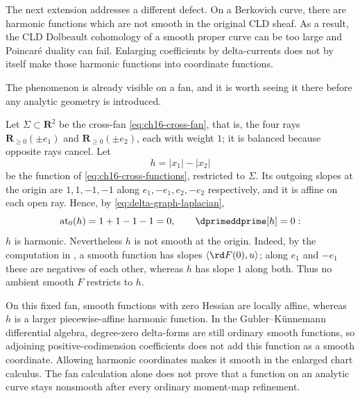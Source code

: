 The next extension addresses a different defect.  On a Berkovich curve,
there are harmonic functions which are not smooth in the original CLD
sheaf.  As a result, the CLD Dolbeault cohomology of a smooth proper curve
can be too large and Poincar\'e duality can fail.  Enlarging coefficients by
delta-currents does not by itself make those harmonic functions into
coordinate functions.

The phenomenon is already visible on a fan, and it is worth seeing it there
before any analytic geometry is introduced.

\begin{example}
\label{ex:ch18-harmonic-not-smooth}
Let $\Sigma\subset\mathbf R^2$ be the cross-fan \eqref{eq:ch16-cross-fan},
that is, the four rays $\mathbf R_{\geq0}(\pm e_1)$ and
$\mathbf R_{\geq0}(\pm e_2)$, each with weight $1$; it is balanced because
opposite rays cancel.  Let
\[
 h=|x_1|-|x_2|
\]
be the function of \eqref{eq:ch16-cross-functions}, restricted to $\Sigma$.
Its outgoing slopes at the origin are $1,1,-1,-1$ along
$e_1,-e_1,e_2,-e_2$ respectively, and it is affine on each open ray.  Hence,
by \eqref{eq:delta-graph-laplacian},
\[
 \operatorname{at}_0(h)=1+1-1-1=0,\qquad
 \dprimeddprime[h]=0 :
\]
$h$ is harmonic.  Nevertheless $h$ is not smooth at the origin.  Indeed, by
the computation in , a smooth function has
slopes $\langle \rd F(0),u\rangle$; along $e_1$ and $-e_1$ these are
negatives of each other, whereas $h$ has slope $1$ along both.  Thus no
ambient smooth $F$ restricts to $h$.

On this fixed fan, smooth functions with zero Hessian are locally affine,
whereas $h$ is a larger piecewise-affine harmonic function.  In the
Gubler--K\"unnemann differential algebra, degree-zero delta-forms are still
ordinary smooth functions, so adjoining positive-codimension coefficients
does not add this function as a smooth coordinate.  Allowing harmonic
coordinates makes it smooth in the enlarged chart calculus.  The fan
calculation alone does not prove that a function on an analytic curve stays
nonsmooth after every ordinary moment-map refinement.
\end{example}


